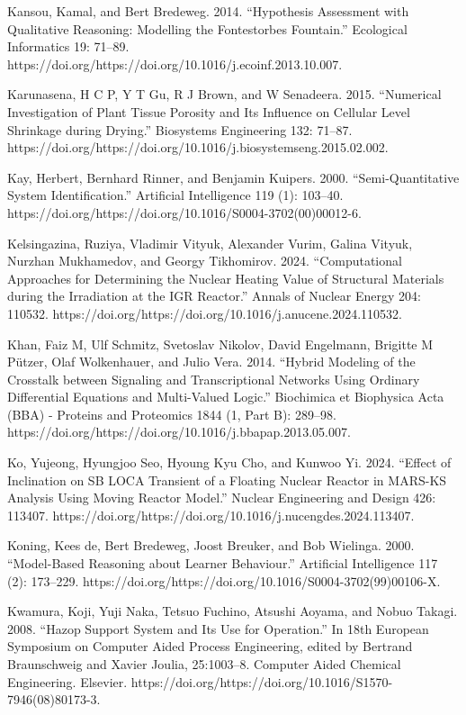 \documentclass[utf8]{gradu3}
\begin{document}
Kansou, Kamal, and Bert Bredeweg. 2014. “Hypothesis Assessment with Qualitative Reasoning: Modelling the Fontestorbes Fountain.” Ecological Informatics 19: 71–89. https://doi.org/https://doi.org/10.1016/j.ecoinf.2013.10.007.

Karunasena, H C P, Y T Gu, R J Brown, and W Senadeera. 2015. “Numerical Investigation of Plant Tissue Porosity and Its Influence on Cellular Level Shrinkage during Drying.” Biosystems Engineering 132: 71–87. https://doi.org/https://doi.org/10.1016/j.biosystemseng.2015.02.002.

Kay, Herbert, Bernhard Rinner, and Benjamin Kuipers. 2000. “Semi-Quantitative System Identification.” Artificial Intelligence 119 (1): 103–40. https://doi.org/https://doi.org/10.1016/S0004-3702(00)00012-6.

Kelsingazina, Ruziya, Vladimir Vityuk, Alexander Vurim, Galina Vityuk, Nurzhan Mukhamedov, and Georgy Tikhomirov. 2024. “Computational Approaches for Determining the Nuclear Heating Value of Structural Materials during the Irradiation at the IGR Reactor.” Annals of Nuclear Energy 204: 110532. https://doi.org/https://doi.org/10.1016/j.anucene.2024.110532.

Khan, Faiz M, Ulf Schmitz, Svetoslav Nikolov, David Engelmann, Brigitte M Pützer, Olaf Wolkenhauer, and Julio Vera. 2014. “Hybrid Modeling of the Crosstalk between Signaling and Transcriptional Networks Using Ordinary Differential Equations and Multi-Valued Logic.” Biochimica et Biophysica Acta (BBA) - Proteins and Proteomics 1844 (1, Part B): 289–98. https://doi.org/https://doi.org/10.1016/j.bbapap.2013.05.007.

Ko, Yujeong, Hyungjoo Seo, Hyoung Kyu Cho, and Kunwoo Yi. 2024. “Effect of Inclination on SB LOCA Transient of a Floating Nuclear Reactor in MARS-KS Analysis Using Moving Reactor Model.” Nuclear Engineering and Design 426: 113407. https://doi.org/https://doi.org/10.1016/j.nucengdes.2024.113407.

Koning, Kees de, Bert Bredeweg, Joost Breuker, and Bob Wielinga. 2000. “Model-Based Reasoning about Learner Behaviour.” Artificial Intelligence 117 (2): 173–229. https://doi.org/https://doi.org/10.1016/S0004-3702(99)00106-X.

Kwamura, Koji, Yuji Naka, Tetsuo Fuchino, Atsushi Aoyama, and Nobuo Takagi. 2008. “Hazop Support System and Its Use for Operation.” In 18th European Symposium on Computer Aided Process Engineering, edited by Bertrand Braunschweig and Xavier Joulia, 25:1003–8. Computer Aided Chemical Engineering. Elsevier. https://doi.org/https://doi.org/10.1016/S1570-7946(08)80173-3.
\end{document}
